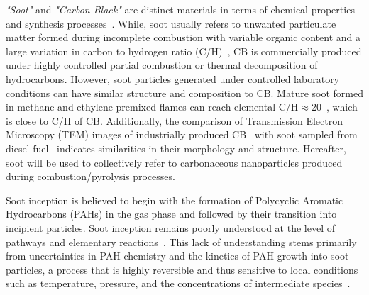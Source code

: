 \textit{"Soot"} and \textit{"Carbon Black"} are distinct materials in terms of chemical properties and synthesis processes~\cite{watson2001carbon}. While, soot usually refers to unwanted particulate matter formed during incomplete combustion with variable organic content and a large variation in carbon to hydrogen ratio (C/H)~\citep{watson2001carbon}, CB is commercially produced under highly controlled partial combustion or thermal decomposition of hydrocarbons. However, soot particles generated under controlled laboratory conditions can have similar structure and composition to CB. Mature soot formed in methane and ethylene premixed flames can reach elemental C/H$\approx$20~\cite{russo2015dehydrogenation}, which is close to C/H of CB. Additionally, the comparison of Transmission Electron Microscopy (TEM) images of industrially produced CB~\citep{singh2018nanostructure} with soot sampled from diesel fuel~\citep{vander2007hrtem, lapuerta2017morphological} indicates similarities in their morphology and structure. Hereafter, soot will be used to collectively refer to carbonaceous nanoparticles produced during combustion/pyrolysis processes.


Soot inception is believed to begin with the formation of Polycyclic Aromatic Hydrocarbons (PAHs) in the gas phase and followed by their transition into incipient particles. Soot inception remains poorly understood at the level of pathways and elementary reactions~\citep{Wang2011}. This lack of understanding stems primarily from uncertainties in PAH chemistry and the kinetics of PAH growth into soot particles, a process that is highly reversible and thus sensitive to local conditions such as temperature, pressure, and the concentrations of intermediate species~\citep{Wang2011}.


